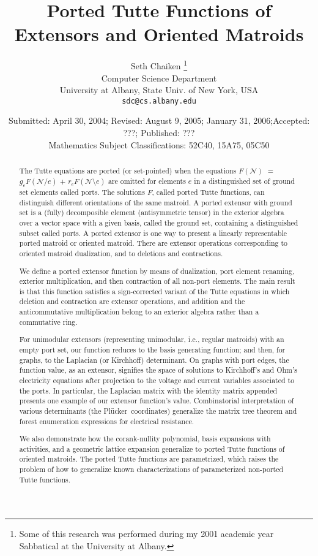 \documentclass[12pt]{article}
\title{Ported Tutte Functions of Extensors and Oriented Matroids}
\author{Seth Chaiken
\thanks{Some of this research was 
performed during my 2001 academic year 
Sabbatical at the University at Albany.}\\
\small Computer Science Department\\[-0.8ex]
\small University at Albany, State Univ. of New York, USA\\[-0.8ex]
\small \texttt{sdc@cs.albany.edu}
}
\date{
\small \comment{Formatted:\today/ } Submitted: April 30, 2004;  
Revised: August 9, 2005; January 31, 2006;Accepted: ???;
 Published: ???\\
\small Mathematics Subject Classifications: 52C40, 15A75, 05C50}
\theoremstyle{definition}
\newcommand{\Plucker}{Pl\"{u}cker\ }
\begin{document}
\maketitle

\begin{abstract}
The Tutte equations are ported (or set-pointed) when the equations
$F(\mathcal{N})$ $=$ $g_eF(\mathcal{N}/e)$ $+$ 
$r_eF(\mathcal{N}\setminus e)$ are 
omitted for elements $e$ in a distinguished set of ground set 
elements called ports.
The solutions $F$, called ported Tutte
functions, can distinguish different orientations of the same matroid. 
A ported extensor with ground set is a (fully) decomposible element
(antisymmetric tensor) in the exterior algebra over a vector space with
a given basis, called the ground set, containing a distinguished subset 
called ports.  A ported extensor is one way to present a linearly 
representable ported matroid or oriented matroid.  There are extensor operations
corresponding to oriented matroid dualization, and to deletions and
contractions.

We define a ported extensor function by means of dualization, 
port element renaming, exterior multiplication, 
and then contraction of all non-port elements.  The main result is
that this function  satisfies 
a sign-corrected variant of the Tutte equations in which deletion
and contraction are extensor operations, and addition and 
the anticommutative multiplication belong to an exterior algebra
rather than a commutative ring.

For unimodular extensors (representing unimodular, i.e., regular
matroids) with an empty port set, our function reduces to the basis
generating function; and then, for graphs, to the Laplacian (or
Kirchhoff) determinant.  On graphs with port edges, the function
value, as an extensor, signifies the space of solutions to Kirchhoff's
and Ohm's electricity equations after projection to the voltage and
current variables associated to the ports.  
In
particular, the Laplacian matrix with the identity matrix appended 
presents one example of our extensor function's value.  
Combinatorial interpretation
of various determinants (the \Plucker coordinates) generalize 
the matrix tree theorem and forest enumeration expressions for 
electrical resistance.  

We also demonstrate how the corank-nullity polynomial, basis expansions
with activities, and a geometric lattice expansion generalize to 
ported Tutte functions of oriented matroids.  The ported 
Tutte functions are parametrized, which raises 
the problem of how to generalize known characterizations
of parameterized non-ported Tutte functions.
\end{abstract}
\end{document}
